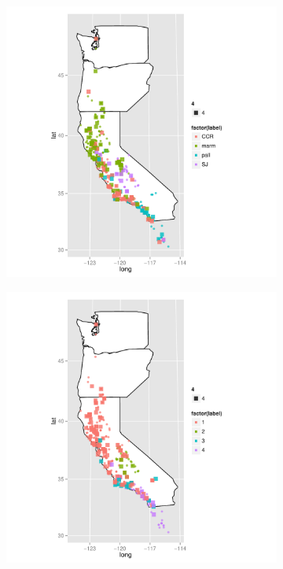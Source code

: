 \documentclass{article}\usepackage{graphicx, color}
\begin{document}
\begin{figure}[t]
  \begin{subfigure}[b]{0.5\textwidth}
    \centering
    \caption{}
    \includegraphics[width = \textwidth]{figure/multi-map3}
    \label{fig:multi-map3}
  \end{subfigure}%
  \begin{subfigure}[b]{0.5\textwidth}
    \centering
    \caption{}
    \includegraphics[width = \textwidth]{figure/multi-map4}

\end{subfigure}
\end{figure}
\end{document}
